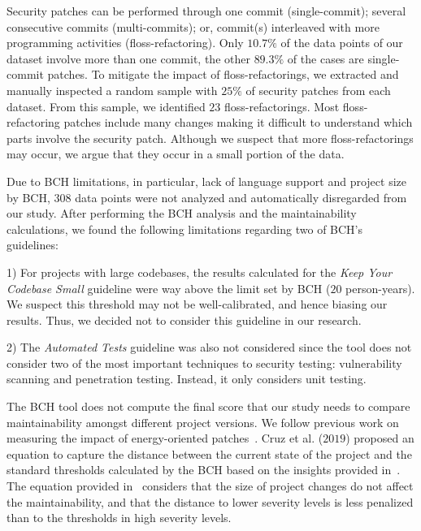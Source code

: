\documentclass[smallextended]{svjour3}       %
\begin{document}
Security patches can be performed through one commit (single-commit); 
several consecutive commits (multi-commits); or, commit(s) interleaved with more 
programming activities (floss-refactoring). Only $10.7\%$ of the data points 
of our dataset involve more than one commit, the other
$89.3\%$ of the cases are single-commit patches. To mitigate the impact of 
floss-refactorings, we extracted and manually inspected a random sample with 
$25\%$ of security patches from each dataset. From this sample, we identified 
$23$ floss-refactorings. Most floss-refactoring patches include many changes 
making it difficult to understand which parts involve the security patch. 
Although we suspect that more floss-refactorings may occur, we argue that 
they occur in a small portion of the data.

Due to BCH limitations, in particular, lack of language support 
and project size by BCH, $308$ data points were not analyzed and automatically 
disregarded from our study. After performing the BCH analysis and the maintainability calculations, we found the following 
limitations regarding two of BCH's guidelines:

1) For projects with large codebases, the results calculated for 
the \emph{Keep Your Codebase Small} guideline were way above the 
limit set by BCH ($20$ person-years). We suspect this threshold 
may not be well-calibrated, and hence biasing our results. Thus, we decided not to consider this guideline in our research. 

2) The 
\emph{Automated Tests} guideline was also not considered since the 
tool does not consider two of the most important techniques to 
security testing: vulnerability scanning and penetration testing. 
Instead, it only considers unit testing. 


The BCH tool does not compute the final score that our study needs 
to compare maintainability amongst different project versions. We 
follow previous work on measuring the impact of 
energy-oriented patches~\cite{8919169}. Cruz et al. ($2019$) 
proposed an equation to capture the distance between the current 
state of the project and the standard thresholds calculated by the 
BCH based on the insights provided in~\cite{Olivari:2018}. The 
equation provided in~\cite{8919169} considers that the size of 
project changes do not affect the maintainability, and that the 
distance to lower severity levels is less penalized than to the
thresholds in high severity levels.
\end{document}
